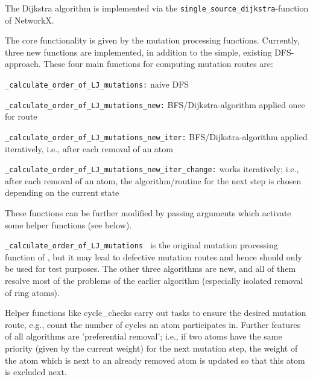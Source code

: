 The Dijkstra algorithm is implemented via the \texttt{single\_source\_dijkstra}-function
of NetworkX.

The core functionality is given by the mutation processing functions.
Currently, three new functions are implemented, in addition to
the simple, existing DFS-approach.
These four main functions for computing mutation routes are: 

\texttt{\_calculate\_order\_of\_LJ\_mutations:} naive DFS 

\texttt{\_calculate\_order\_of\_LJ\_mutations\_new:} BFS/Dijkstra-algorithm
applied once for route

\texttt{\_calculate\_order\_of\_LJ\_mutations\_new\_iter:} BFS/Dijkstra-algorithm
applied iteratively, i.e., after each removal of an atom 

\texttt{\_calculate\_order\_of\_LJ\_mutations\_new\_iter\_change:}
works iteratively; i.e., after each removal of an atom, the algorithm/routine for the next step is chosen depending on the current state

These functions
can be further modified by passing arguments which activate some helper
functions (see below).


\texttt{\_calculate\_order\_of\_LJ\_mutations } is the original mutation processing function of \trafo, but it may lead to  defective mutation routes and hence
should only be used for test purposes. The other three algorithms
are new, and all of them resolve most of the problems of the earlier
algorithm (especially isolated removal of ring atoms).

Helper functions like cycle\_checks carry out tasks to ensure the
desired mutation route, e.g., count the number of cycles an atom participates
in. Further features of all algorithms are 'preferential removal';
i.e., if two atoms have the same priority (given by the current
weight) for the next mutation step, the weight of the atom which is
next to an already removed atom is updated so that this atom is excluded
next.

